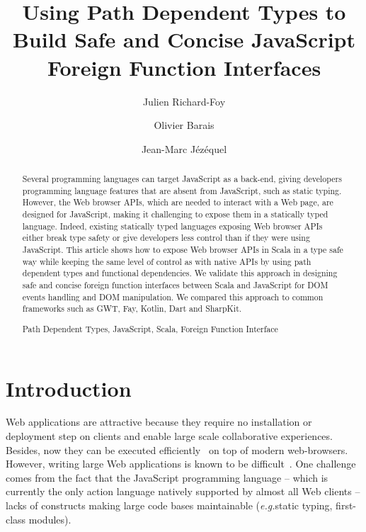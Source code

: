 \documentclass[runningheads,a4paper]{llncs}
\newcommand{\keywords}[1]{\par\addvspace\baselineskip
\noindent\keywordname\enspace\ignorespaces#1}
\newcommand{\eg}{\emph{e.g.}}
\begin{document}
\mainmatter

\title{Using Path Dependent Types to Build Safe and Concise JavaScript Foreign Function Interfaces}

\author{Julien Richard-Foy \and Olivier Barais\and Jean-Marc Jézéquel}


\maketitle


\begin{abstract}
Several programming languages can target JavaScript as a back-end, giving developers programming language features
that are absent from JavaScript, such as static typing. However, the Web browser APIs, which are needed to interact
with a Web page, are designed for JavaScript, making it challenging to expose them in a statically typed language.
Indeed, existing statically typed languages exposing Web browser APIs either break type safety or give developers
less control than if they were using JavaScript. This article shows how to expose Web browser APIs in Scala in a
type safe way while keeping the same level of control as with native APIs by using path dependent types and functional
dependencies. We validate this approach in designing safe and concise foreign function interfaces between Scala and
JavaScript for DOM events handling and DOM manipulation. We compared this approach to common frameworks such as GWT,
Fay, Kotlin, Dart and SharpKit.
\keywords{Path Dependent Types, JavaScript, Scala, Foreign Function Interface}
\end{abstract}


\section{Introduction}

Web applications are attractive because they require no installation or deployment step on clients and enable large
scale collaborative experiences. Besides, now they can be executed efficiently~\cite{Gal:2009:TJT:1542476.1542528} on top of modern web-browsers. 
However, writing large Web applications is known to be
difficult~\cite{Mikkonen08_SpaghettiJs,Preciado05_RIAMethodologyNecessity}. One challenge comes from the fact that
the JavaScript programming language -- which is currently the only action language natively supported by almost all
Web clients -- lacks of constructs making large code bases maintainable (\eg static typing, first-class modules).
\end{document}
